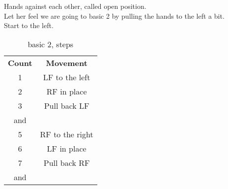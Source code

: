 Hands against each other, called open position.\\
Let her feel we are going to basic 2 by pulling the hands to the left a bit.\\
Start to the left.
\begin{table}[H]
\centering
\begin{tabular}{cc}
  \toprule
  \textbf{Count} & \textbf{Movement}\\
  \cmidrule(lr){1-1}\cmidrule(lr){2-2}
  1 & LF to the left\\
  2 & RF in place\\
  3 & Pull back LF\\
  and & \\
  5 & RF to the right\\
  6 & LF in place\\
  7 & Pull back RF\\
  and & \\
  \bottomrule
\end{tabular}
\label{basic1_hands}
\caption{basic 2, steps}
\end{table}

